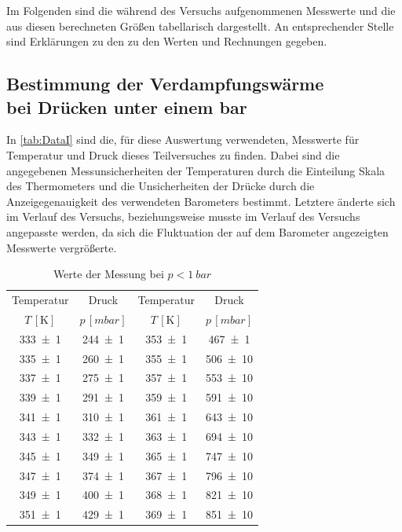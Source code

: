 Im Folgenden sind die während des Versuchs aufgenommenen Messwerte und die aus diesen 
berechneten Größen tabellarisch dargestellt. An entsprechender Stelle sind Erklärungen
zu den zu den Werten und Rechnungen gegeben.\\

\subsection{Bestimmung der Verdampfungswärme\\ bei Drücken unter einem bar}
	In \autoref{tab:DataI} sind die, für diese Auswertung verwendeten, Messwerte für Temperatur und 
	Druck dieses Teilversuches zu finden. Dabei sind die angegebenen Messunsicherheiten der Temperaturen
	durch die Einteilung Skala des Thermometers und die Unsicherheiten der Drücke durch die Anzeigegenauigkeit 
	des verwendeten Barometers bestimmt. Letztere änderte sich im Verlauf des Versuchs, beziehungsweise
	musste im Verlauf des Versuchs angepasste werden, da sich die Fluktuation der auf dem Barometer angezeigten
	Messwerte vergrößerte.  
	
		\begin{table}[!h]
			\centering
			\begin{tabular}{|c|c||c|c|}
				\hline
				    Temperatur      &       Druck       &      Temperatur      &       Druck       \\
				$T\,[\si{\kelvin}]$ & $p\,[\si{mbar}] $ & $ T\,[\si{\kelvin}]$ & $ p\,[\si{mbar}]$ \\ \hline\hline
				   \num{333(1)}     &   \num{244(1)}    &     \num{353(1)}     &   \num{467(1)}    \\
				   \num{335(1)}     &   \num{260(1)}    &     \num{355(1)}     &   \num{506(10)}   \\
				   \num{337(1)}     &   \num{275(1)}    &     \num{357(1)}     &   \num{553(10)}   \\
				   \num{339(1)}     &   \num{291(1)}    &     \num{359(1)}     &   \num{591(10)}   \\
				   \num{341(1)}     &   \num{310(1)}    &     \num{361(1)}     &   \num{643(10)}   \\
				   \num{343(1)}     &   \num{332(1)}    &     \num{363(1)}     &   \num{694(10)}   \\
				   \num{345(1)}     &   \num{349(1)}    &     \num{365(1)}     &   \num{747(10)}   \\
				   \num{347(1)}     &   \num{374(1)}    &     \num{367(1)}     &   \num{796(10)}   \\
				   \num{349(1)}     &   \num{400(1)}    &     \num{368(1)}     &   \num{821(10)}   \\
				   \num{351(1)}     &   \num{429(1)}    &     \num{369(1)}     &   \num{851(10)}   \\ \hline
			\end{tabular}
			\caption{Werte der Messung bei $p < \SI{1}{bar}$ \label{tab:DataI}}
		\end{table}
	
